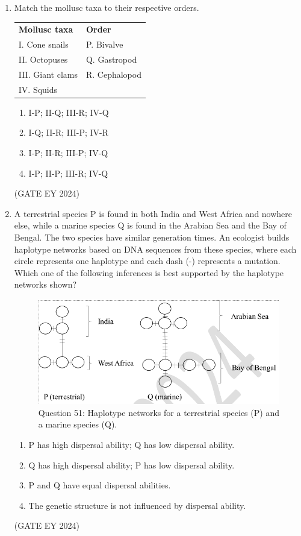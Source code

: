 \documentclass[journal]{IEEEtran}
\begin{document}
\begin{enumerate}
\item Match the mollusc taxa to their respective orders.
\begin{tabular}{ll}
\textbf{Mollusc taxa} & \textbf{Order} \\
I. Cone snails & P. Bivalve \\
II. Octopuses & Q. Gastropod \\
III. Giant clams & R. Cephalopod \\
IV. Squids & \\
\end{tabular}
    \begin{multicols}{2}
    \begin{enumerate}
        \item I-P; II-Q; III-R; IV-Q
        \item I-Q; II-R; III-P; IV-R
        \item I-P; II-R; III-P; IV-Q
        \item I-P; II-P; III-R; IV-Q
    \end{enumerate}
    \end{multicols}
\hfill{(GATE EY 2024)}

\item A terrestrial species P is found in both India and West Africa and nowhere else, while a marine species Q is found in the Arabian Sea and the Bay of Bengal. The two species have similar generation times. An ecologist builds haplotype networks based on DNA sequences from these species, where each circle represents one haplotype and each dash (-) represents a mutation. Which one of the following inferences is best supported by the haplotype networks shown?
\begin{figure}[!ht]
    \centering
    \includegraphics[width=0.3\columnwidth]{figs/Q-51.png}
    \caption{Question 51: Haplotype networks for a terrestrial species (P) and a marine species (Q).}
    \label{Q.51}
\end{figure}

    \begin{enumerate}
        \item P has high dispersal ability; Q has low dispersal ability.
        \item Q has high dispersal ability; P has low dispersal ability.
        \item P and Q have equal dispersal abilities.
        \item The genetic structure is not influenced by dispersal ability.
    \end{enumerate}
\hfill{(GATE EY 2024)}


\end{enumerate}
\end{document}
